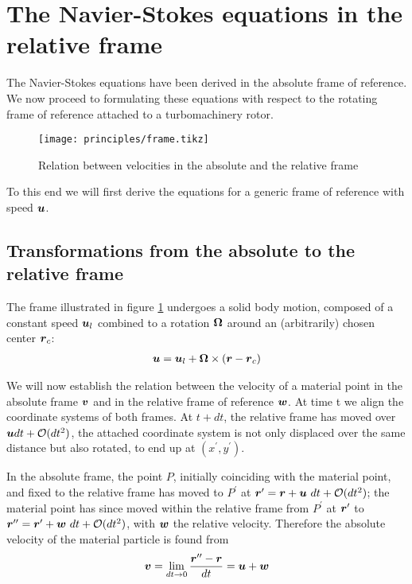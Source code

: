 
\section{The Navier-Stokes equations in the relative frame}
\label{sec:principles:navierStokesRelative}

The Navier-Stokes equations have been derived in the absolute frame of
reference. We now proceed to formulating these equations with respect
to the rotating frame of reference attached to a turbomachinery rotor. 
\begin{figure}[!h]
  \centering
  \texttt{[image: principles/frame.tikz]}
  \caption{Relation between velocities in the absolute and the relative frame}
  \label{fig:frameOfReference}
\end{figure}
To this end we will first derive the equations for a generic frame of
reference with speed $\boldsymbol {u}$. 

\subsection{Transformations from the absolute to the relative frame}

The frame illustrated in figure \ref{fig:frameOfReference} undergoes a
solid body motion, composed of a constant speed $\boldsymbol {u}_l$ combined to
a rotation $\boldsymbol {\Omega}$ around an (arbitrarily) chosen center $\boldsymbol {r}_c$:
\begin{align*}
  \boldsymbol {u} =  
  \boldsymbol {u}_l + 
  \boldsymbol {\Omega} \times \left(\boldsymbol {r} - \boldsymbol {r}_c\right)
\end{align*}

We will now establish the relation between the velocity of a material
point in the absolute frame $\boldsymbol {v}$ and in the relative frame of
reference $\boldsymbol {w}$. At time t we align the coordinate systems of both
frames. At $t+dt$, the relative frame has moved over $\boldsymbol {u} dt +
\mathcal O(dt^2)$, the attached coordinate system is not only
displaced over the same distance but also rotated, to end up at
$(x^\prime,y^\prime)$.

In the absolute frame, the point $P$, initially coinciding with the
material point, and fixed to the relative frame has moved to
$P^\prime$ at $\boldsymbol {r}^\prime = \boldsymbol {r} + \boldsymbol {u}~dt + \mathcal O(dt^2)$;
 the
material point has since moved within the relative frame from $P^\prime$ at $\boldsymbol {r}^\prime$ to
$\boldsymbol {r}^{\prime \prime} = \boldsymbol {r}^\prime + \boldsymbol {w}~dt + \mathcal
O(dt^2)$, with $\boldsymbol {w}$ the relative velocity. Therefore the absolute velocity of the material particle is
found from
\begin{align*}
  \boldsymbol {v} = \lim_{dt\rightarrow 0} \frac{\boldsymbol {r}^{\prime \prime} - \boldsymbol {r}}{dt} = \boldsymbol {u} + \boldsymbol {w}
\end{align*}

